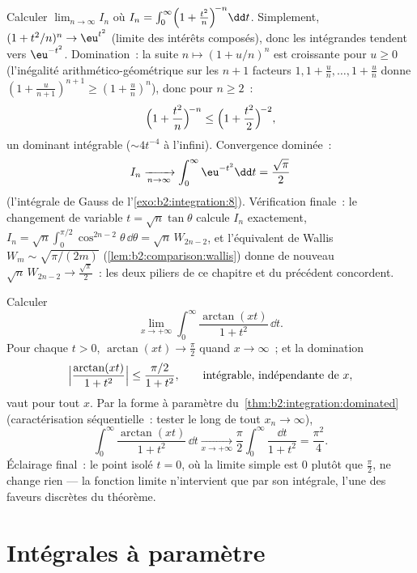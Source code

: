 \begin{example}\label{ex:b2:integration:wallislimit}
Calculer $\displaystyle\lim_{n\to\infty} I_n$ où $I_n =
\int_0^\infty \Bigl(1 + \frac{t^2}{n}\Bigr)^{\!-n}\dd t$.
Simplement, $(1 + t^2/n)^n \to \eu^{t^2}$ (limite des intérêts
composés), donc les intégrandes tendent vers $\eu^{-t^2}$. Domination~: la
suite $n \mapsto (1 + u/n)^n$ est croissante pour $u \geq 0$
(l'inégalité arithmético-géométrique sur les $n + 1$ facteurs $1, 1 + \frac un, \dots, 1 +
\frac un$ donne $(1 + \frac u{n+1})^{n+1} \geq (1 + \frac
un)^n$), donc pour $n \geq 2$~:
\[
\Bigl(1 + \frac{t^2}{n}\Bigr)^{\!-n}
\leq \Bigl(1 + \frac{t^2}{2}\Bigr)^{\!-2},
\]
un dominant intégrable ($\sim 4t^{-4}$ à l'infini). Convergence
dominée~:
\[
I_n \xrightarrow[n\to\infty]{} \int_0^\infty \eu^{-t^2}\dd t
= \frac{\sqrt\pi}{2}
\]
(l'intégrale de Gauss de l'\cref{exo:b2:integration:8}). Vérification
finale~: le changement de variable $t = \sqrt n\tan\theta$ calcule $I_n$
exactement, $I_n = \sqrt n\int_0^{\pi/2}\cos^{2n-2}\theta\,\dd\theta
= \sqrt n\,W_{2n-2}$, et l'équivalent de Wallis $W_m \sim
\sqrt{\pi/(2m)}$ (\cref{lem:b2:comparison:wallis}) donne de nouveau $\sqrt
n\,W_{2n-2} \to \frac{\sqrt\pi}2$~: les deux piliers de ce
chapitre et du précédent concordent.
\end{example}

\begin{example}
\label{ex:b2:integration:arctanlimit}
Calculer
\[
\lim_{x\to+\infty}\int_0^\infty
\frac{\arctan(xt)}{1+t^2}\,\dd t .
\]
Pour chaque $t > 0$,
$\arctan(xt) \to \frac\pi2$ quand $x \to \infty$~; et la
domination
\[
\Bigl|\frac{\arctan(xt)}{1+t^2}\Bigr|
\leq \frac{\pi/2}{1+t^2},
\qquad\text{intégrable, indépendante de } x,
\]
vaut pour tout $x$. Par la forme à paramètre  du~\cref{thm:b2:integration:dominated} (caractérisation
séquentielle~: tester le long de tout $x_n \to \infty$),
\[
\int_0^\infty\frac{\arctan(xt)}{1+t^2}\,\dd t
\xrightarrow[x\to+\infty]{}
\frac\pi2\int_0^\infty\frac{\dd t}{1+t^2}
= \frac{\pi^2}{4} .
\]
Éclairage final~: le point isolé $t = 0$, où la limite simple
est $0$ plutôt que $\frac\pi2$, ne change rien --- la
fonction limite n'intervient que par son intégrale, l'une des
faveurs discrètes du théorème.
\end{example}

\section{Intégrales à paramètre}

